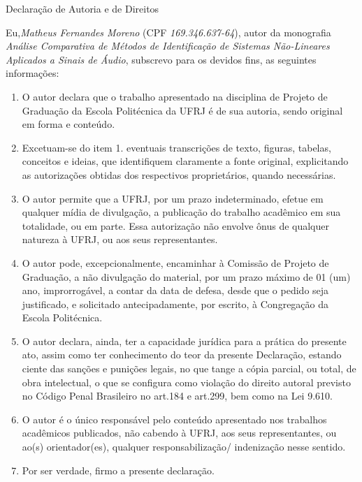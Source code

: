 \pagebreak
\pagestyle{plain}
\begin{center}
Declaração de Autoria e de Direitos
\end{center}

\vspace{0.5cm}

Eu,\@author \emph{Matheus Fernandes Moreno} (CPF \emph{169.346.637-64}), autor da monografia \emph{Análise Comparativa de Métodos de Identificação de Sistemas Não-Lineares Aplicados a Sinais de Áudio}, subscrevo para os devidos fins, as seguintes informações:

\begin{enumerate}
    \item O autor declara que o trabalho apresentado na disciplina de Projeto de Graduação da Escola Politécnica da UFRJ é de sua autoria, sendo original em forma e conteúdo.
    \item Excetuam-se do item 1. eventuais transcrições de texto, figuras, tabelas, conceitos e ideias, que identifiquem claramente a fonte original, explicitando as autorizações obtidas dos respectivos proprietários, quando necessárias.
    \item O autor permite que a UFRJ, por um prazo indeterminado, efetue em qualquer mídia de divulgação, a publicação do trabalho acadêmico em sua totalidade, ou em parte. Essa autorização não envolve ônus de qualquer natureza à UFRJ, ou aos seus representantes.
    \item O autor pode, excepcionalmente, encaminhar à Comissão de Projeto de Graduação, a não divulgação do material, por um prazo máximo de 01 (um) ano, improrrogável, a contar da data de defesa, desde que o pedido seja justificado, e solicitado antecipadamente, por escrito, à Congregação da Escola Politécnica.
    \item O autor declara, ainda, ter a capacidade jurídica para a prática do presente ato, assim como ter conhecimento do teor da presente Declaração, estando ciente das sanções e punições legais, no que tange a cópia parcial, ou total, de obra intelectual, o que se configura como violação do direito autoral previsto no Código Penal Brasileiro no art.184 e art.299, bem como na Lei 9.610.
    \item O autor é o único responsável pelo conteúdo apresentado nos trabalhos acadêmicos publicados, não cabendo à UFRJ, aos seus representantes,  ou ao(s) orientador(es), qualquer responsabilização/ indenização nesse sentido.
    \item Por ser verdade, firmo a presente declaração.
\end{enumerate}

\vspace{0.75cm}
\begin{flushright}
\parbox{10cm}{
    \hrulefill

    \vspace{-0.2cm}

    \vspace{0.1cm}
}
\end{flushright}